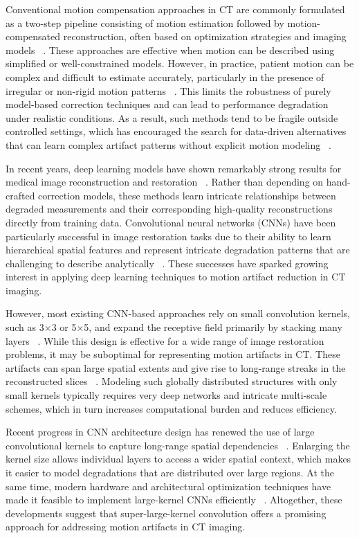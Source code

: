 Conventional motion compensation approaches in CT are commonly formulated as a two-step pipeline consisting of motion estimation followed by motion-compensated reconstruction, often based on optimization strategies and imaging models  ~\cite{thies2025_cbctmotion}. These approaches are effective when motion can be described using simplified or well-constrained models. However, in practice, patient motion can be complex and difficult to estimate accurately, particularly in the presence of irregular or non-rigid motion patterns ~\cite{boas_ct_artifacts}. This limits the robustness of purely model-based correction techniques and can lead to performance degradation under realistic conditions. As a result, such methods tend to be fragile outside controlled settings, which has encouraged the search for data-driven alternatives that can learn complex artifact patterns without explicit motion modeling ~\cite{datadriven23}. 

In recent years, deep learning models have shown remarkably strong results for medical image reconstruction and restoration ~\cite{ahishakiye2021survey, modality_dl_recon}. Rather than depending on hand-crafted correction models, these methods learn intricate relationships between degraded measurements and their corresponding high-quality reconstructions directly from training data. Convolutional neural networks (CNNs) have been particularly successful in image restoration tasks due to their ability to learn hierarchical spatial features and represent intricate degradation patterns that are challenging to describe analytically ~\cite{Goodfellow2016, modality_dl_recon}. These successes have sparked growing interest in applying deep learning techniques to motion artifact reduction in CT imaging. 

However, most existing CNN-based approaches rely on small convolution kernels, such as 3×3 or 5×5, and expand the receptive field primarily by stacking many layers ~\cite{simonyan2015vgg}.  While this design is effective for a wide range of image restoration problems, it may be suboptimal for representing motion artifacts in CT. These artifacts can span large spatial extents and give rise to long-range streaks in the reconstructed slices ~\cite{boas_ct_artifacts}. Modeling such globally distributed structures with only small kernels typically requires very deep networks and intricate multi-scale schemes, which in turn increases computational burden and reduces efficiency.


Recent progress in CNN architecture design has renewed the use of large convolutional kernels to capture long-range spatial dependencies ~\cite{replknet2022, Luo2016}. Enlarging the kernel size allows individual layers to access a wider spatial context, which makes it easier to model degradations that are distributed over large regions. At the same time, modern hardware and architectural optimization techniques have made it feasible to implement large-kernel CNNs efficiently ~\cite{replknet2022}. Altogether, these developments suggest that super-large-kernel convolution offers a promising approach for addressing motion artifacts in CT imaging.


